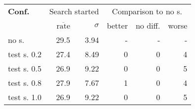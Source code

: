 \begin{tabular}{ l r r | r r r }
\hline 
\textbf{Conf.} & \multicolumn{2}{c|}{Search started} & \multicolumn{3}{c}{Comparison to no s.} \\ 
  & $\overline{\text{rate}}$ & $\sigma$ & better & no diff. & worse \\ 
\hline 
no s. & 29.5 & 3.94 & - & - & - \\ 
test s. 0.2 & 27.4 & 8.49 & 0 & 0 & 4 \\ 
test s. 0.5 & 26.9 & 9.22 & 0 & 0 & 5 \\ 
test s. 0.8 & 27.9 & 7.67 & 1 & 0 & 4 \\ 
test s. 1.0 & 26.9 & 9.22 & 0 & 0 & 5 \\ 
\hline 
\end{tabular}